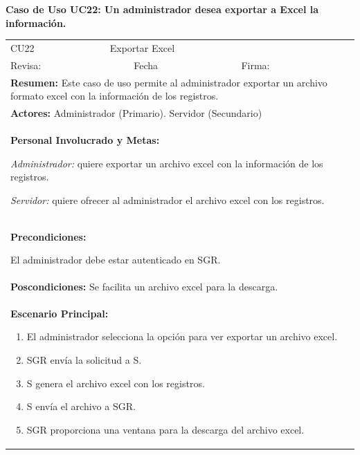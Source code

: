 		\textbf{Caso de Uso UC22: Un administrador desea exportar a Excel la información.}
			\begin{longtable}{|l|p{5.5cm}|l|p{2cm}|l|p{1.9cm}|} \hline
					\cellcolor{grisOscuro} CU22 & \multicolumn{4}{|l|}{  \cellcolor{grisOscuro} Exportar Excel} &  \cellcolor{grisClaro}\multirow{2}{1cm}{} \\ \cline{1-5}
					\cellcolor{grisOscuro} Revisa: &  \cellcolor{grisClaro} &  \cellcolor{grisOscuro} Fecha &  \cellcolor{grisClaro} &  \cellcolor{grisOscuro} Firma: & \cellcolor{grisClaro} \\ \hline
					\multicolumn{6}{|p{15cm}|}{ \textbf{Resumen: } Este caso de uso permite al administrador exportar un archivo formato excel con la información de los registros.

					} \\ \hline

					\multicolumn{6}{|p{15cm}|}{ \textbf{Actores: } Administrador (Primario). Servidor (Secundario)

					} \\ \hline

					\multicolumn{6}{|p{15cm}|}{ \textbf{Personal Involucrado y Metas: }
					
					\emph{Administrador:} quiere exportar un archivo excel con la información de los registros.

					\emph{Servidor:} quiere ofrecer al administrador el archivo excel con los registros.
					} \\ \hline

					\multicolumn{6}{|p{15cm}|}{ \textbf{Precondiciones: } 
					
					El administrador debe estar autenticado en SGR.

					} \\ \hline

					\multicolumn{6}{|p{15cm}|}{ \textbf{Poscondiciones: } Se facilita un archivo excel para la descarga.

					} \\ \hline

					\multicolumn{6}{|p{15cm}|}{ \textbf{Escenario Principal: }

					\begin{enumerate}
							\item El administrador selecciona la opción para ver exportar un archivo excel.
							\item SGR envía la solicitud a S.
							\item S genera el archivo excel con los registros.
							\item S envía el archivo a SGR.
							\item SGR proporciona una ventana para la descarga del archivo excel.
					\end{enumerate}

}
\end{longtable}
